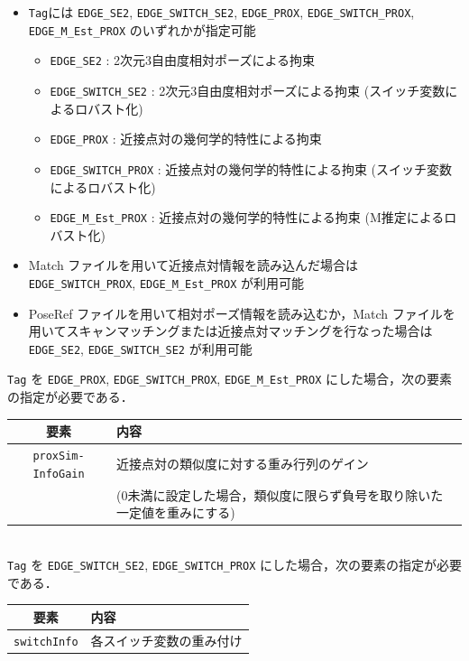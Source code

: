 \documentclass[dvipdfmx]{jsarticle}
\begin{document}
\begin{itemize}
	\item \verb|Tag|には \verb|EDGE_SE2|, \verb|EDGE_SWITCH_SE2|, \verb|EDGE_PROX|, \verb|EDGE_SWITCH_PROX|, \verb|EDGE_M_Est_PROX| のいずれかが指定可能
	\begin{itemize}
		\item[] \verb|EDGE_SE2| : 2次元3自由度相対ポーズによる拘束
		\item[] \verb|EDGE_SWITCH_SE2| : 2次元3自由度相対ポーズによる拘束 (スイッチ変数によるロバスト化)
		\item[] \verb|EDGE_PROX| : 近接点対の幾何学的特性による拘束
		\item[] \verb|EDGE_SWITCH_PROX| : 近接点対の幾何学的特性による拘束 (スイッチ変数によるロバスト化)
		\item[] \verb|EDGE_M_Est_PROX| : 近接点対の幾何学的特性による拘束 (M推定によるロバスト化)
	\end{itemize}
	\item Match ファイルを用いて近接点対情報を読み込んだ場合は \verb|EDGE_SWITCH_PROX|, \verb|EDGE_M_Est_PROX| が利用可能
	\item PoseRef ファイルを用いて相対ポーズ情報を読み込むか，Match ファイルを用いてスキャンマッチングまたは近接点対マッチングを行なった場合は \verb|EDGE_SE2|, \verb|EDGE_SWITCH_SE2| が利用可能
\end{itemize}

\verb|Tag| を \verb|EDGE_PROX|, \verb|EDGE_SWITCH_PROX|, \verb|EDGE_M_Est_PROX| にした場合，次の要素の指定が必要である．

\begin{tabular}{c|l}
	\hline
	要素 & 内容 \\
	\hline \hline
	\verb|proxSim-InfoGain| & 近接点対の類似度に対する重み行列のゲイン \vspace{-5pt}\\
		& (0未満に設定した場合，類似度に限らず負号を取り除いた一定値を重みにする) \\
	\hline
\end{tabular}\\

\verb|Tag| を \verb|EDGE_SWITCH_SE2|, \verb|EDGE_SWITCH_PROX| にした場合，次の要素の指定が必要である．

\begin{tabular}{c|l}
	\hline
	要素 & 内容 \\
	\hline \hline
	\verb|switchInfo| & 各スイッチ変数の重み付け \\
	\hline
\end{tabular}\\
\end{document}
